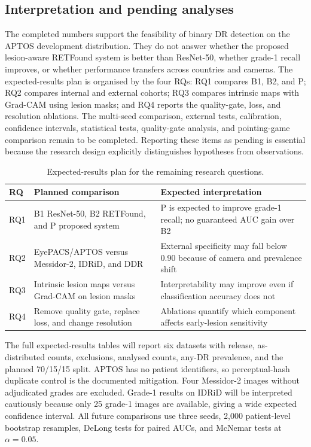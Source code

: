 \documentclass[11pt,a4paper]{article}
\begin{document}
\subsection{Interpretation and pending analyses}
The completed numbers support the feasibility of binary DR detection on the APTOS development distribution. They do not answer whether the proposed lesion-aware RETFound system is better than ResNet-50, whether grade-1 recall improves, or whether performance transfers across countries and cameras. The expected-results plan is organised by the four RQs: RQ1 compares B1, B2, and P; RQ2 compares internal and external cohorts; RQ3 compares intrinsic maps with Grad-CAM using lesion masks; and RQ4 reports the quality-gate, loss, and resolution ablations. The multi-seed comparison, external tests, calibration, confidence intervals, statistical tests, quality-gate analysis, and pointing-game comparison remain to be completed. Reporting these items as pending is essential because the research design explicitly distinguishes hypotheses from observations.

\begin{table}[H]\centering\small
\caption{Expected-results plan for the remaining research questions.}\label{tab:expected}
\begin{tabularx}{0.96\linewidth}{lX X}\toprule
RQ & Planned comparison & Expected interpretation\\\midrule
RQ1 & B1 ResNet-50, B2 RETFound, and P proposed system & P is expected to improve grade-1 recall; no guaranteed AUC gain over B2\\
RQ2 & EyePACS/APTOS versus Messidor-2, IDRiD, and DDR & External specificity may fall below 0.90 because of camera and prevalence shift\\
RQ3 & Intrinsic lesion maps versus Grad-CAM on lesion masks & Interpretability may improve even if classification accuracy does not\\
RQ4 & Remove quality gate, replace loss, and change resolution & Ablations quantify which component affects early-lesion sensitivity\\\bottomrule
\end{tabularx}\end{table}

The full expected-results tables will report six datasets with release, as-distributed counts, exclusions, analysed counts, any-DR prevalence, and the planned 70/15/15 split. APTOS has no patient identifiers, so perceptual-hash duplicate control is the documented mitigation. Four Messidor-2 images without adjudicated grades are excluded. Grade-1 results on IDRiD will be interpreted cautiously because only 25 grade-1 images are available, giving a wide expected confidence interval. All future comparisons use three seeds, 2,000 patient-level bootstrap resamples, DeLong tests for paired AUCs, and McNemar tests at $\alpha=0.05$.
\end{document}
